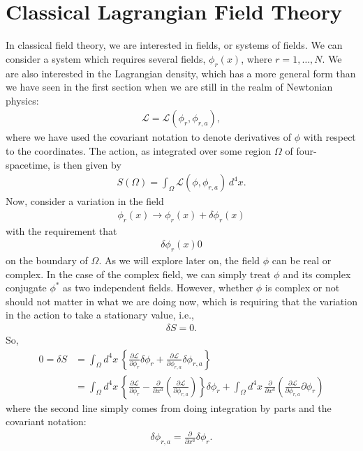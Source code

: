 \documentclass{book}
\numberwithin{equation}{section}
\theoremstyle{definition}
\newcommand{\p}{\partial}
\newcommand{\lag}{\mathcal{L}}
\begin{document}
\section{Classical Lagrangian Field Theory}
In classical field theory, we are interested in fields, or systems of fields. We can consider a system which requires several fields, $\phi_r(x)$, where $r=1,\dots,N$. We are also interested in the Lagrangian density, which has a more general form than we have seen in the first section when we are still in the realm of Newtonian physics:
\begin{align}
\lag = \lag(\phi_r, \phi_{r,a}),
\end{align}
where we have used the covariant notation to denote derivatives of $\phi$ with respect to the coordinates. The action, as integrated over some region $\Omega$ of four-spacetime, is then given by
\begin{align}
S(\Omega) = \int_\Omega \lag(\phi, \phi_{r,a})\,d^4x.
\end{align}
Now, consider a variation in the field
\begin{align}
\phi_r(x) \to \phi_r(x) + \delta \phi_r(x)
\end{align}
with the requirement that
\begin{align}
\delta \phi_r(x) 0
\end{align}
 on the boundary of $\Omega$. As we will explore later on, the field $\phi$ can be real or complex. In the case of the complex field, we can simply treat $\phi$ and its complex conjugate $\phi^*$ as two independent fields. However, whether $\phi$ is complex or not should not matter in what we are doing now, which is requiring that the variation in the action to take a stationary value, i.e.,
 \begin{align}
 \delta S = 0.
 \end{align}
So,
\begin{align}
0 = \delta S &= \int_\Omega  d^4x\,\left\{ \frac{\p\lag}{\p\phi_r}\delta \phi_r + \frac{\p\lag}{\p\phi_{r,a}}\delta \phi_{r,a}    \right\}\\
&= \int_\Omega d^4x\, \left\{ \frac{\p\lag}{\p\phi_r} - \frac{\p}{\p x^a}\left( \frac{\p\lag}{\p\phi_{r,a}} \right) \right\}\delta \phi_r +  \int_\Omega d^4x\,\frac{\p}{\p x^a}\left(\frac{\p\lag}{\p\phi_{r,a}}\p \phi_r \right)
\end{align}
where the second line simply comes from doing integration by parts and the covariant notation:
\begin{align}
\delta \phi_{r,a} = \frac{\p}{\p x^a}\delta \phi_r.
\end{align}
\end{document}
